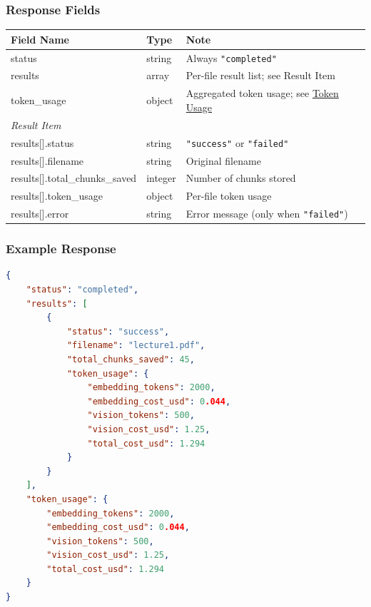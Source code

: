 \documentclass[11pt]{article}
\begin{document}
\subsubsection{Response Fields}

\begin{longtable}{|p{5cm}|p{2cm}|p{7.7cm}|}
  \hline
  \rowcolor{tabheader}
  \textbf{Field Name} & \textbf{Type} & \textbf{Note} \\
  \hline
  \endhead
  status             & string  & Always \texttt{"completed"} \\
  \hline
  results            & array   & Per-file result list; see Result Item \\
  \hline
  token\_usage       & object  & Aggregated token usage; see \hyperref[sec:tokenusage]{Token Usage} \\
  \hline
  \multicolumn{3}{|l|}{\textit{Result Item}} \\
  \hline
  results[].status              & string  & \texttt{"success"} or \texttt{"failed"} \\
  \hline
  results[].filename            & string  & Original filename \\
  \hline
  results[].total\_chunks\_saved & integer & Number of chunks stored \\
  \hline
  results[].token\_usage        & object  & Per-file token usage \\
  \hline
  results[].error               & string  & Error message (only when \texttt{"failed"}) \\
  \hline
\end{longtable}

\subsubsection{Example Response}

\begin{lstlisting}[language=json]
{
    "status": "completed",
    "results": [
        {
            "status": "success",
            "filename": "lecture1.pdf",
            "total_chunks_saved": 45,
            "token_usage": {
                "embedding_tokens": 2000,
                "embedding_cost_usd": 0.044,
                "vision_tokens": 500,
                "vision_cost_usd": 1.25,
                "total_cost_usd": 1.294
            }
        }
    ],
    "token_usage": {
        "embedding_tokens": 2000,
        "embedding_cost_usd": 0.044,
        "vision_tokens": 500,
        "vision_cost_usd": 1.25,
        "total_cost_usd": 1.294
    }
}
\end{lstlisting}
\end{document}
